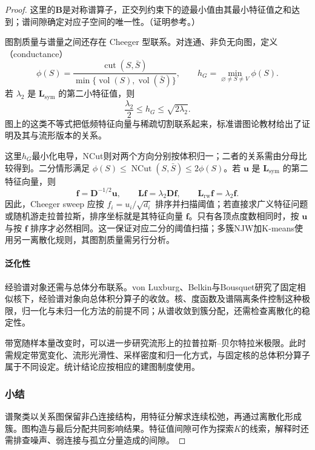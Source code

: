 \begin{proof}
这里的$\bm B$是对称谱算子，正交列约束下的迹最小值由其最小特征值之和达到；谱间隙确定对应子空间的唯一性。（证明参考。）

图割质量与谱量之间还存在 Cheeger 型联系。对连通、非负无向图，定义（conductance）
\[
 \phi(S)=
 \frac{\operatorname{cut}(S,\bar S)}
 {\min\{\operatorname{vol}(S),\operatorname{vol}(\bar S)\}},
 \qquad h_G=\min_{\varnothing\ne S\ne V}\phi(S).
\]
若 $\lambda_2$ 是 $\bm{L}_{\mathrm{sym}}$ 的第二小特征值，则
\begin{equation}
 \frac{\lambda_2}{2}\leq h_G\leq\sqrt{2\lambda_2}.
 \label{eq:clustering-cheeger}
\end{equation}
图上的这类不等式把低频特征向量与稀疏切割联系起来，标准谱图论教材给出了证明及其与流形版本的关系。

这里$h_G$最小化电导，NCut则对两个方向分别按体积归一；二者的关系需由分母比较得到。二分情形满足 $\phi(S)\leq\operatorname{NCut}(S,\bar S)\leq2\phi(S)$。若 $\bm{u}$ 是 $\bm{L}_{\mathrm{sym}}$ 的第二特征向量，则
\[
 \bm{f}=\bm{D}^{-1/2}\bm{u},
 \qquad
 \bm{L}\bm{f}=\lambda_2\bm{D}\bm{f},
 \qquad
 \bm{L}_{\mathrm{rw}}\bm{f}=\lambda_2\bm{f}.
\]
因此，Cheeger sweep 应按 $f_i=u_i/\sqrt{d_i}$ 排序并扫描阈值；若直接求广义特征问题或随机游走拉普拉斯，排序坐标就是其特征向量 $\bm{f}$。只有各顶点度数相同时，按 $\bm{u}$ 与按 $\bm{f}$ 排序才必然相同。这一保证对应二分的阈值扫描；多簇NJW加K-means使用另一离散化规则，其图割质量需另行分析。

\paragraph{泛化性}
经验谱对象还需与总体分布联系。von Luxburg、Belkin与Bousquet研究了固定相似核下，经验谱对象向总体积分算子的收敛。核、度函数及谱隔离条件控制这种极限，归一化与未归一化方法的前提不同；从谱收敛到簇分配，还需检查离散化的稳定性。

带宽随样本量改变时，可以进一步研究流形上的拉普拉斯--贝尔特拉米极限。此时需规定带宽变化、流形光滑性、采样密度和归一化方式，与固定核的总体积分算子属于不同设定。统计结论应按相应的建图制度使用。

\subsubsection{小结}

谱聚类以关系图保留非凸连接结构，用特征分解求连续松弛，再通过离散化形成簇。图构造与最后分配共同影响结果。特征值间隙可作为探索$K$的线索，解释时还需排查噪声、弱连接与孤立分量造成的间隙。


\end{proof}
